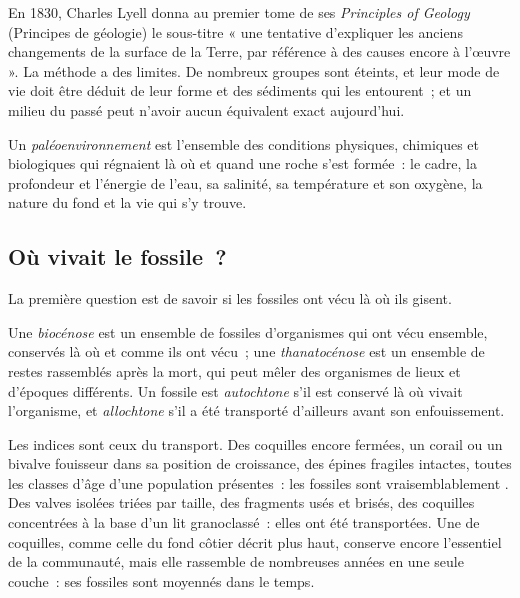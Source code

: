 En 1830, Charles Lyell donna au premier tome de ses \emph{Principles of Geology} (Principes
de géologie) le sous-titre « une tentative d'expliquer les anciens changements de la surface
de la Terre, par référence à des causes encore à l'œuvre ». La méthode a des limites. De
nombreux groupes sont éteints, et leur mode de vie doit être déduit de leur forme et des sédiments
qui les entourent~; et un milieu du passé peut n'avoir aucun équivalent exact aujourd'hui.

\begin{definition}[Paléoenvironnement]\label{def:b2:palaeoenvironments:palaeoenvironment}
Un \emph{paléoenvironnement} est l'ensemble
des conditions physiques, chimiques et biologiques qui régnaient là où et quand
une roche s'est formée~: le cadre, la profondeur et l'énergie de l'eau, sa
salinité, sa température et son oxygène, la nature du fond et la vie qui s'y trouve.
\end{definition}

\subsection*{Où vivait le fossile~?}

La première question est de savoir si les fossiles ont vécu là où ils gisent.

\begin{definition}\label{def:b2:palaeoenvironments:assemblages} Une \emph{biocénose} est un ensemble
de fossiles d'organismes qui ont vécu ensemble, conservés là où et comme ils ont vécu~;
une \emph{thanatocénose} est un ensemble de restes rassemblés après la
mort, qui peut mêler des organismes de lieux et d'époques différents. Un fossile est
\emph{autochtone} s'il est conservé là où vivait l'organisme, et
\emph{allochtone} s'il a été transporté d'ailleurs avant son enfouissement.
\end{definition}

Les indices sont ceux du transport. Des coquilles encore fermées, un corail ou un bivalve fouisseur dans sa
position de croissance, des épines fragiles intactes, toutes les classes d'âge d'une population présentes~:
les fossiles sont vraisemblablement . Des valves isolées triées par taille, des fragments usés et
brisés, des coquilles concentrées à la base d'un lit granoclassé~: elles ont été transportées. Une 
de coquilles, comme celle du fond côtier décrit plus haut, conserve encore l'essentiel de la communauté,
mais elle rassemble de nombreuses années en une seule couche~: ses fossiles sont moyennés dans le temps.

